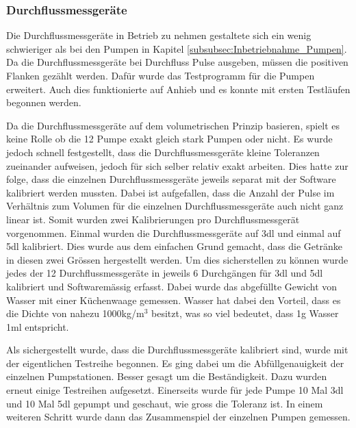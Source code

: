 \subsubsection{Durchflussmessgeräte}
\label{subsubsec:Inbetriebnahme_Durchflussmessgeräte}

Die Durchflussmessgeräte in Betrieb zu nehmen gestaltete sich ein wenig schwieriger als bei den Pumpen in Kapitel \ref{subsubsec:Inbetriebnahme_Pumpen}. Da die Durchflussmessgeräte bei Durchfluss Pulse ausgeben, müssen die positiven Flanken gezählt werden. Dafür wurde das Testprogramm für die Pumpen erweitert. Auch dies funktionierte auf Anhieb und es konnte mit ersten Testläufen begonnen werden. 

Da die Durchflussmessgeräte auf dem volumetrischen Prinzip basieren, spielt es keine Rolle ob die 12 Pumpe exakt gleich stark Pumpen oder nicht. Es wurde jedoch schnell festgestellt, dass die Durchflussmessgeräte kleine Toleranzen zueinander aufweisen, jedoch für sich selber relativ exakt arbeiten. Dies hatte zur folge, dass die einzelnen Durchflussmessgeräte jeweils separat mit der Software kalibriert werden mussten. Dabei ist aufgefallen, dass die Anzahl der Pulse im Verhältnis zum Volumen für die einzelnen Durchflussmessgeräte auch nicht ganz linear ist. Somit wurden zwei Kalibrierungen pro Durchflussmessgerät vorgenommen. Einmal wurden die Durchflussmessgeräte auf 3dl und einmal auf 5dl kalibriert. Dies wurde aus dem einfachen Grund gemacht, dass die Getränke in diesen zwei Grössen hergestellt werden. Um dies sicherstellen zu können wurde jedes der 12 Durchflussmessgeräte in jeweils 6 Durchgängen für 3dl und 5dl kalibriert und Softwaremässig erfasst. Dabei wurde das abgefüllte Gewicht von Wasser mit einer Küchenwaage gemessen. Wasser hat dabei den Vorteil, dass es die Dichte von nahezu 1000kg/m$^3$ besitzt, was so viel bedeutet, dass 1g Wasser 1ml entspricht. \cite{wagner_iapws_2002}


Als sichergestellt wurde, dass die Durchflussmessgeräte kalibriert sind, wurde mit der eigentlichen Testreihe begonnen. Es ging dabei um die Abfüllgenauigkeit der einzelnen Pumpstationen. Besser gesagt um die Beständigkeit. Dazu wurden erneut einige Testreihen aufgesetzt. Einerseits wurde für jede Pumpe 10 Mal 3dl und 10 Mal 5dl gepumpt und geschaut, wie gross die Toleranz ist. In einem weiteren Schritt wurde dann das Zusammenspiel der einzelnen Pumpen gemessen. 


